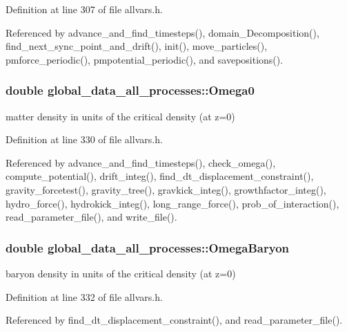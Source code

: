 Definition at line 307 of file allvars.h.



Referenced by advance\_\-and\_\-find\_\-timesteps(), domain\_\-Decomposition(), find\_\-next\_\-sync\_\-point\_\-and\_\-drift(), init(), move\_\-particles(), pmforce\_\-periodic(), pmpotential\_\-periodic(), and savepositions().

\hypertarget{structglobal__data__all__processes_abac5eca1b5851e670eec01d4dd47c417}{
\subsubsection[{Omega0}]{\setlength{\rightskip}{0pt plus 5cm}double {\bf global\_\-data\_\-all\_\-processes::Omega0}}}
\label{structglobal__data__all__processes_abac5eca1b5851e670eec01d4dd47c417}
matter density in units of the critical density (at z=0) 

Definition at line 330 of file allvars.h.



Referenced by advance\_\-and\_\-find\_\-timesteps(), check\_\-omega(), compute\_\-potential(), drift\_\-integ(), find\_\-dt\_\-displacement\_\-constraint(), gravity\_\-forcetest(), gravity\_\-tree(), gravkick\_\-integ(), growthfactor\_\-integ(), hydro\_\-force(), hydrokick\_\-integ(), long\_\-range\_\-force(), prob\_\-of\_\-interaction(), read\_\-parameter\_\-file(), and write\_\-file().

\hypertarget{structglobal__data__all__processes_a5656f8668fd420a86cb7372869745fee}{
\subsubsection[{OmegaBaryon}]{\setlength{\rightskip}{0pt plus 5cm}double {\bf global\_\-data\_\-all\_\-processes::OmegaBaryon}}}
\label{structglobal__data__all__processes_a5656f8668fd420a86cb7372869745fee}
baryon density in units of the critical density (at z=0) 

Definition at line 332 of file allvars.h.



Referenced by find\_\-dt\_\-displacement\_\-constraint(), and read\_\-parameter\_\-file().

